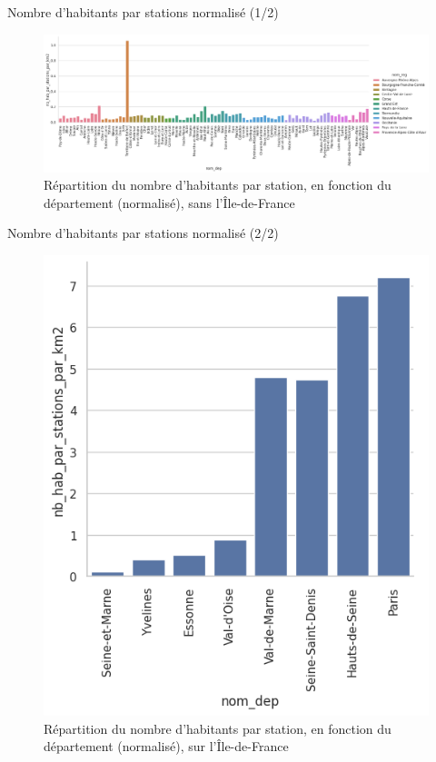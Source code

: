\begin{frame}{Nombre d'habitants par stations normalisé (1/2)}
    \begin{figure}
        \includegraphics[width=0.9\paperwidth]{images/barplots/nb_hab_par_stations_par_km2_sansIDF.png}
        \caption{\label{fig:nb_hap_par_stat_par_dep_norm_ssIDF}Répartition du nombre d'habitants par station, en fonction du département (normalisé), sans l'Île-de-France}
    \end{figure}
\end{frame}

\begin{frame}{Nombre d'habitants par stations normalisé (2/2)}
    \begin{figure}
        \includegraphics[height=0.55\paperheight]{images/barplots/nb_hab_par_stations_par_km2_IDF.png}
        \caption{\label{fig:nb_hap_par_stat_par_dep_norm_IDF}Répartition du nombre d'habitants par station, en fonction du département (normalisé), sur l'Île-de-France}
    \end{figure}
\end{frame}

